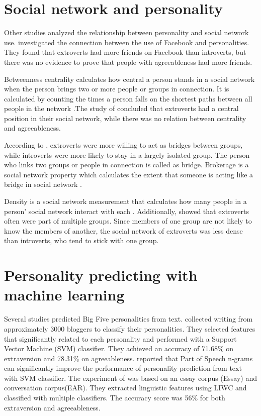 \documentclass[
10pt, %
a4paper, %
oneside, %
headinclude,footinclude, %
] {book}%
\begin{document}
\section{Social network and personality}

Other studies analyzed the relationship between personality and social network use. \citet{amichai2010social} investigated the connection between the use of Facebook and personalities. They found that extroverts had more friends on Facebook than introverts, but there was no evidence to prove that people with agreeableness had more friends.

Betweenness centrality calculates how central a person stands in a social network when the person brings two or more people or groups in connection. It is calculated by counting the times a person falls on the shortest paths between all people in the network  \citep{brandes2001faster}.The study of \citet{wehrli2008personality} concluded that extroverts had a central position in their social network, while there was no relation between centrality and agreeableness. 

According to \citet{friggeri2012psychological}, extroverts were more willing to act as bridges between groups, while introverts were more likely to stay in a largely isolated group. The person who links two groups or people in connection is called as bridge. Brokerage is a social network property which calculates the extent that someone is acting like a bridge in social network \citep{haythornthwaite1996social}.

Density is a social network measurement that calculates how many people in a person’ social network interact with each \citep{haythornthwaite1996social}. Additionally, \citet{golbeck2011predicting} showed that extroverts often were part of multiple groups. Since members of one group are not likely to know the members of another, the social network of extroverts was less dense than introverts, who tend to stick with one group.

\section{Personality predicting with machine learning}

Several studies predicted Big Five personalities from text. \citet{iacobelli2011large} collected writing from approximately 3000 bloggers to classify their personalities. They selected features that significantly related to each personality and performed with a Support Vector Machine (SVM) classifier. They achieved an accuracy of 71.68\% on extraversion and 78.31\% on agreeableness. \citet{wright2014personality} reported that Part of Speech n-grams can significantly improve the performance of personality prediction from text with SVM classifier. The experiment of \citet{mairesse2007using} was based on an essay corpus (Essay) and conversation corpus(EAR). They extracted linguistic features using LIWC and classified with multiple classifiers. The accuracy score was 56\% for both extraversion and agreeableness.
\end{document}
